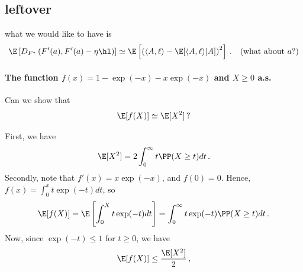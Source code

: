 \subsection{leftover}
what we would like to have is
\begin{align*}
    \E\left[D_{F^\star}\left(F'(a), F'(a) - \eta \hl\right)\right]
                        & \simeq
    \E\left[\left(
        \langle A, \ell \rangle
        -
        \E[
            \langle A, \ell \rangle | A
        ]
    \right)^2\right]\,. & (\text{what about }a?)
\end{align*}
\begin{center}
\end{center}
\paragraph{The function \texorpdfstring{$f(x) = 1 - \exp(-x) - x \exp(-x)$}{f(x) = 1 - exp(-x) - x exp(-x)} and \texorpdfstring{$X \geq 0$}{X >= 0} a.s.}
Can we show that
\begin{align*}
    \E[f(X)] \simeq \E[X^2]\,?
\end{align*}

First, we have
\begin{align*}
    \E[X^2] = 2 \int_{0}^{\infty} t \PP(X \geq t) dt\,.
\end{align*}
Secondly, note that $f'(x) = x \exp(-x)$, and $f(0) = 0$. Hence,
$f(x) = \int_{0}^x t \exp(-t) dt$, so
\begin{align*}
    \E[f(X)]
    = \E\left[
        \int_0^X t \exp(-t) dt
        \right]
    = \int_0^\infty t \exp(-t) \PP(X \geq t) dt\,.
\end{align*}
Now, since $\exp(-t) \leq 1$ for $t \geq 0$, we have
\begin{align*}
    \E[f(X)] \leq \frac{\E[X^2]}{2}\,,
\end{align*}

